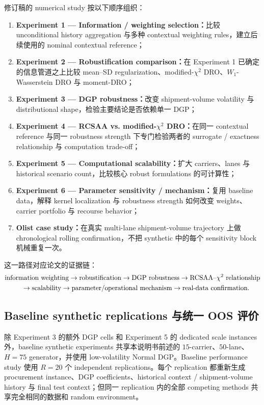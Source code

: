 \documentclass[11pt,a4paper]{ctexart}
\begin{document}
修订稿的 numerical study 按以下顺序组织：
\begin{enumerate}[leftmargin=2.4em,itemsep=0.22em]
\item \textbf{Experiment 1 --- Information / weighting selection：}比较 unconditional history aggregation 与多种 contextual weighting rules，建立后续使用的 nominal contextual reference；
\item \textbf{Experiment 2 --- Robustification comparison：}在 Experiment 1 已确定的信息管道之上比较 mean--SD regularization、modified-$\chi^2$ DRO、$W_1$-Wasserstein DRO 与 moment-DRO；
\item \textbf{Experiment 3 --- DGP robustness：}改变 shipment-volume volatility 与 distributional shape，检验主要结论是否依赖单一 DGP；
\item \textbf{Experiment 4 --- RCSAA vs. modified-$\chi^2$ DRO：}在同一 contextual reference 与同一 robustness strength 下专门检验两者的 surrogate / exactness relationship 与 computation trade-off；
\item \textbf{Experiment 5 --- Computational scalability：}扩大 carriers、lanes 与 historical scenario count，比较核心 robust formulations 的可计算性；
\item \textbf{Experiment 6 --- Parameter sensitivity / mechanism：}复用 baseline data，解释 kernel localization 与 robustness strength 如何改变 weights、carrier portfolio 与 recourse behavior；
\item \textbf{Olist case study：}在真实 multi-lane shipment-volume trajectory 上做 chronological rolling confirmation，不把 synthetic 中的每个 sensitivity block 机械重复一次。
\end{enumerate}

这一路径对应论文的证据链：
\[
\begin{aligned}
&\text{information weighting}\rightarrow\text{robustification}\rightarrow\text{DGP robustness}
\rightarrow\text{RCSAA--}\chi^2\text{ relationship}\\
&\hspace{2.5em}\rightarrow\text{scalability}\rightarrow\text{parameter/operational mechanism}
\rightarrow\text{real-data confirmation}.
\end{aligned}
\]

\subsection{Baseline synthetic replications 与统一 OOS 评价}

除 Experiment 3 的额外 DGP cells 和 Experiment 5 的 dedicated scale instances 外，baseline synthetic experiments 共享本说明书前述的 $15$-carrier、$50$-lane、$H=75$ generator，并使用 low-volatility Normal DGP。Baseline performance study 使用 $R=20$ 个 independent replications。每个 replication 都重新生成 procurement instance、DGP coefficients、historical context / shipment-volume history 与 final test context；但同一 replication 内的全部 competing methods 共享完全相同的数据和 random environment。
\end{document}

